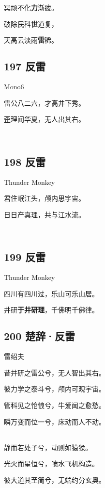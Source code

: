 冥顽不化\textbf{力}渐疲。

破除民科\textbf{世}道复，

天高云淡雨\textbf{雷}稀。

\hypertarget{ux53cdux96f7-4}{%
\subsection{197 反雷}\label{ux53cdux96f7-4}}

Mono6

雷公八二六，才高井下秀。

歪理闻华夏，无人出其右。

~\\

\hypertarget{ux53cdux96f7-5}{%
\subsection{198 反雷}\label{ux53cdux96f7-5}}

Thunder Monkey

君住岷江头，颅内思宇宙。

日日产真理，共与江水流。

~\\

\hypertarget{ux53cdux96f7-6}{%
\subsection{199 反雷}\label{ux53cdux96f7-6}}

Thunder Monkey

四川有四川过，乐山可乐山居。

井研\textbf{于井研理}，千佛明千佛律。

\hypertarget{ux695aux8f9eux53cdux96f7}{%
\subsection{200 楚辞·反雷}\label{ux695aux8f9eux53cdux96f7}}

雷绍夫

昔井研之雷公兮，无人智出其右。

彼力学之泰斗兮，颅内可观宇宙。

管科见之怆悢兮，牛爱闻之愈愁。

瞬万变而位一兮，床动而人不动。

~\\
静而若处子兮，动则如猿猱。

光火而星恒兮，喷水飞机构造。

彼大道其至简兮，无端约分玄奥。

